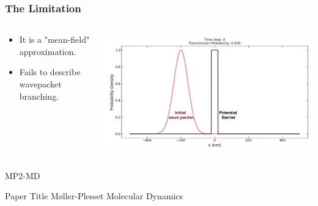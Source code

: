 \begin{frame}
    \frametitle{The Limitation}
    \begin{columns}[T]
        \begin{column}{0.5\textwidth}
            \vspace{2cm}
            \begin{itemize}
                \item It is a "mean-field" approximation.
                \item Fails to describe wavepacket branching.
            \end{itemize}
        \end{column}
        \begin{column}{0.5\textwidth}
            \includegraphics[width=\textwidth]{images/ehrenfest3.png}
        \end{column}
    \end{columns}
\end{frame}


\begin{frame}{MP2-MD}
	\begin{block}{Paper Title}
	Møller-Plesset Molecular Dynamics 
	\end{block}
\end{frame}


